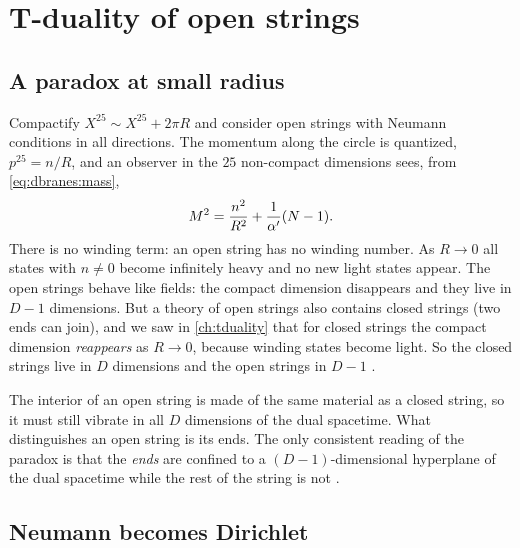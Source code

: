 \section{T-duality of open strings}\label{sec:dbranes:tduality}

\subsection{A paradox at small radius}

Compactify $X^{25}\sim X^{25}+2\pi R$ and consider open strings with Neumann conditions in all
directions. The momentum along the circle is quantized, $p^{25}=n/R$, and an observer in the
$25$ non-compact dimensions sees, from \eqref{eq:dbranes:mass},
\begin{equation}\label{eq:dbranes:massR}
 M^2=\frac{n^2}{R^2}+\frac1{\alpha'}(N-1).
\end{equation}
There is no winding term: an open string has no winding number. As $R\to0$ all states with
$n\ne0$ become infinitely heavy and no new light states appear. The open strings behave like
fields: the compact dimension disappears and they live in $D-1$ dimensions. But a theory of open
strings also contains closed strings (two ends can join), and we saw in \cref{ch:tduality} that
for closed strings the compact dimension \emph{reappears} as $R\to0$, because winding states
become light. So the closed strings live in $D$ dimensions and the open strings in $D-1$
.

\begin{physicsbox}
The interior of an open string is made of the same material as a closed string, so it must still
vibrate in all $D$ dimensions of the dual spacetime. What distinguishes an open string is its
ends. The only consistent reading of the paradox is that the \emph{ends} are confined to a
$(D-1)$-dimensional hyperplane of the dual spacetime while the rest of the string is not
.
\end{physicsbox}

\subsection{Neumann becomes Dirichlet}


